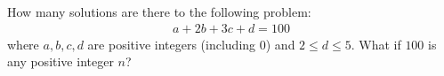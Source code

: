 How many solutions are there to 
the following problem:
\begin{align*}
a + 2b + 3c + d = 100
\end{align*}
where $a, b, c, d$ are positive integers (including $0$)
and $2 \leq d \leq 5$.
What if $100$ is any positive integer $n$?
